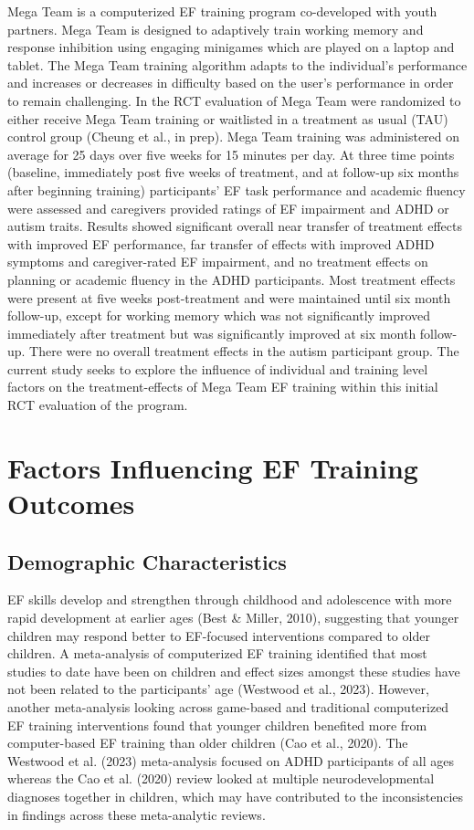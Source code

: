 \documentclass[
  letterpaper,
]{ut-thesis}
\begin{document}
Mega Team is a computerized EF training program co-developed with youth
partners. Mega Team is designed to adaptively train working memory and
response inhibition using engaging minigames which are played on a
laptop and tablet. The Mega Team training algorithm adapts to the
individual's performance and increases or decreases in difficulty based
on the user's performance in order to remain challenging. In the RCT
evaluation of Mega Team were randomized to either receive Mega Team
training or waitlisted in a treatment as usual (TAU) control group
(Cheung et al., in prep). Mega Team training was administered on average
for 25 days over five weeks for 15 minutes per day. At three time points
(baseline, immediately post five weeks of treatment, and at follow-up
six months after beginning training) participants' EF task performance
and academic fluency were assessed and caregivers provided ratings of EF
impairment and ADHD or autism traits. Results showed significant overall
near transfer of treatment effects with improved EF performance, far
transfer of effects with improved ADHD symptoms and caregiver-rated EF
impairment, and no treatment effects on planning or academic fluency in
the ADHD participants. Most treatment effects were present at five weeks
post-treatment and were maintained until six month follow-up, except for
working memory which was not significantly improved immediately after
treatment but was significantly improved at six month follow-up. There
were no overall treatment effects in the autism participant group. The
current study seeks to explore the influence of individual and training
level factors on the treatment-effects of Mega Team EF training within
this initial RCT evaluation of the program.

\section{Factors Influencing EF Training
Outcomes}\label{factors-influencing-ef-training-outcomes}

\subsection{Demographic
Characteristics}\label{demographic-characteristics}

EF skills develop and strengthen through childhood and adolescence with
more rapid development at earlier ages (Best \& Miller, 2010),
suggesting that younger children may respond better to EF-focused
interventions compared to older children. A meta-analysis of
computerized EF training identified that most studies to date have been
on children and effect sizes amongst these studies have not been related
to the participants' age (Westwood et al., 2023). However, another
meta-analysis looking across game-based and traditional computerized EF
training interventions found that younger children benefited more from
computer-based EF training than older children (Cao et al., 2020). The
Westwood et al. (2023) meta-analysis focused on ADHD participants of all
ages whereas the Cao et al. (2020) review looked at multiple
neurodevelopmental diagnoses together in children, which may have
contributed to the inconsistencies in findings across these
meta-analytic reviews.
\end{document}
